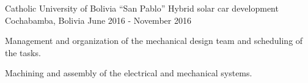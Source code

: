 

\begin{cventries}

  \cventry
    {Catholic University of Bolivia ``San Pablo''} %
    {Hybrid solar car development} %
    {Cochabamba, Bolivia} %
    {June 2016 - November 2016} %
    {
      \begin{cvitems} %
        \item Management and organization of the mechanical design
        team and scheduling of the tasks.
        \item Machining and assembly of the electrical and mechanical
        systems.
      \end{cvitems}
    }

\end{cventries}
